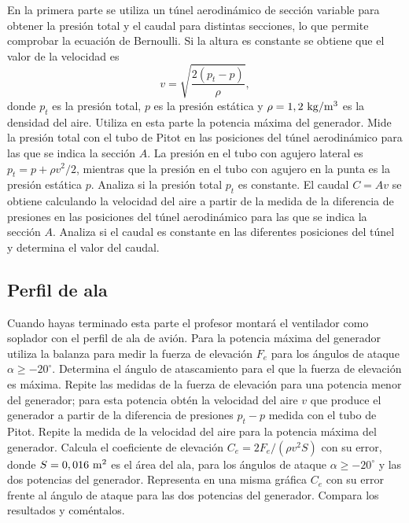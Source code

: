 \documentclass[11pt]{articulo}
\begin{document}
En la primera parte se utiliza un t\'unel aerodin\'amico de secci\'on variable para obtener la presi\'on total y el caudal para distintas secciones, lo que permite comprobar la ecuaci\'on de Bernoulli. Si la altura es constante se obtiene que el valor de la velocidad es
%
\begin{equation*}
v = \sqrt{\frac{2(p_t - p)}{\rho}},
\end{equation*}
%
donde $p_t$ es la presi\'on total,  $p$ es la presi\'on est\'atica y $\rho = 1,2~{\rm kg/m^3}$ es la densidad del aire. Utiliza en esta parte la potencia m\'axima del generador. Mide la presi\'on total con el tubo de Pitot en las posiciones del t\'unel aerodin\'amico para las que se indica la secci\'on $A$. La presi\'on en el tubo con agujero lateral es $p_t = p + \rho v^2 / 2$, mientras que la presi\'on en el tubo con agujero en la punta es la presi\'on est\'atica $p$. Analiza si la presi\'on total $p_t$ es constante. El caudal $C = Av$ se obtiene calculando la velocidad del aire a partir de la medida de la diferencia de presiones en las posiciones del t\'unel aerodin\'amico para las que se indica la secci\'on $A$. Analiza si el caudal es constante en las diferentes posiciones del t\'unel y determina el valor del caudal.

\subsection{Perfil de ala}

Cuando hayas terminado esta parte el profesor montar\'a el ventilador como soplador con el perfil de ala de avi\'on. Para la potencia m\'axima del generador utiliza la balanza para medir la fuerza de elevaci\'on $F_e$ para los \'angulos de ataque $\alpha \ge -20^{\circ}$. Determina el \'angulo de atascamiento para el que la fuerza de elevaci\'on es m\'axima. Repite las medidas de la fuerza de elevaci\'on para una potencia menor del generador; para esta potencia obt\'en la velocidad del aire $v$ que produce el generador a partir de la diferencia de presiones $p_t - p$ medida con el tubo de Pitot. Repite la medida de la velocidad del aire para la potencia m\'axima del generador. Calcula el coeficiente de elevaci\'on $C_e = 2 F_e / (\rho v^2 S)$ con su error, donde $S = 0,016~{\rm m^2}$ es el \'area del ala, para los \'angulos de ataque $\alpha \geq -20^{\circ}$ y las dos potencias del generador. Representa en una misma gr\'afica $C_e$ con su error frente al \'angulo de ataque para las dos potencias del generador. Compara los resultados y com\'entalos.
\end{document}
